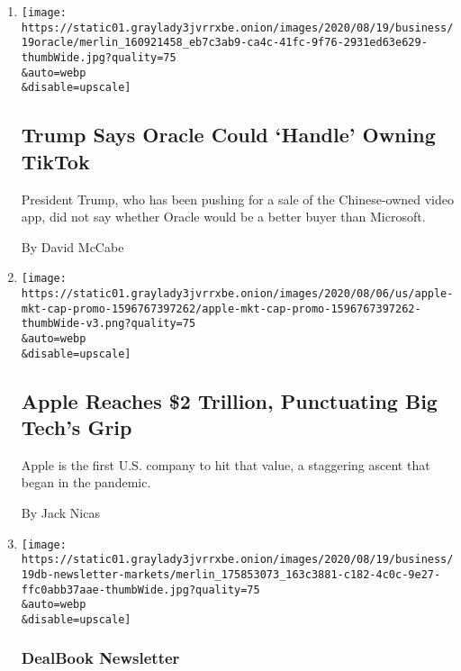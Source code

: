 \begin{enumerate}
\def\labelenumi{\arabic{enumi}.}
\item
  \href{/2020/08/19/technology/trump-oracle-tiktok.html}{}

  \texttt{[image: https://static01.graylady3jvrrxbe.onion/images/2020/08/19/business/19oracle/merlin\_160921458\_eb7c3ab9-ca4c-41fc-9f76-2931ed63e629-thumbWide.jpg?quality=75\\\&auto=webp\\\&disable=upscale]}

  \hypertarget{trump-says-oracle-could-handle-owning-tiktok}{%
  \subsection{Trump Says Oracle Could `Handle' Owning
  TikTok}\label{trump-says-oracle-could-handle-owning-tiktok}}

  President Trump, who has been pushing for a sale of the Chinese-owned
  video app, did not say whether Oracle would be a better buyer than
  Microsoft.

  By David McCabe
\item
  \href{/2020/08/19/technology/apple-2-trillion.html}{}

  \texttt{[image: https://static01.graylady3jvrrxbe.onion/images/2020/08/06/us/apple-mkt-cap-promo-1596767397262/apple-mkt-cap-promo-1596767397262-thumbWide-v3.png?quality=75\\\&auto=webp\\\&disable=upscale]}

  \hypertarget{apple-reaches-2-trillion-punctuating-big-techs-grip}{%
  \subsection{Apple Reaches \$2 Trillion, Punctuating Big Tech's
  Grip}\label{apple-reaches-2-trillion-punctuating-big-techs-grip}}

  Apple is the first U.S. company to hit that value, a staggering ascent
  that began in the pandemic.

  By Jack Nicas
\item
  \href{/2020/08/19/business/dealbook/stock-market-record-high.html}{}

  \texttt{[image: https://static01.graylady3jvrrxbe.onion/images/2020/08/19/business/19db-newsletter-markets/merlin\_175853073\_163c3881-c182-4c0c-9e27-ffc0abb37aae-thumbWide.jpg?quality=75\\\&auto=webp\\\&disable=upscale]}

  \hypertarget{dealbook-newsletter-1}{%
  \subsubsection{DealBook Newsletter}\label{dealbook-newsletter-1}}


\end{enumerate}
